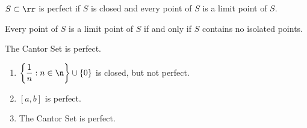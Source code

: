 \begin{definition}[Perfect]
    $S\subset\rr$ is perfect if $S$ is closed and every point of $S$ is a limit point of $S$.
\end{definition}

\begin{remark}
    Every point of $S$ is a limit point of $S$ if and only if $S$ contains no isolated points.
\end{remark}

\begin{proposition*}{
    The Cantor Set is perfect.
}
\end{proposition*}

\begin{example}
    \begin{enumerate}
        \item $\left\{\dfrac{1}{n} : n\in\n\right\}\cup\{0\}$ is closed, but not perfect.
        \item $[a,b]$ is perfect.
        \item The Cantor Set is perfect.
    \end{enumerate}
\end{example}